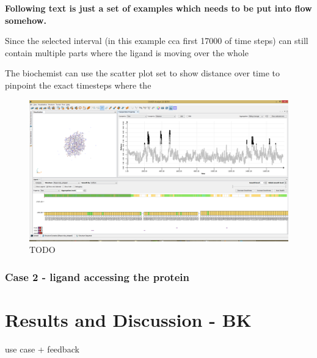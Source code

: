 \documentclass[twocolumn]{bmcart}%
\begin{document}
{\color{red}
\textbf{Following text is just a set of examples which needs to be put into flow somehow.}} 

Since the selected interval (in this example cca first 17000 of time steps) can still contain multiple parts where the ligand is moving over the whole    


The biochemist can use the scatter plot set to show distance over time to pinpoint the exact timesteps  where the 

\begin{figure}[htb]
	\centering
  \includegraphics[width=0.95\linewidth]{img/case_example_1.png}
  \caption{\label{fig:case_overview} {\color{red}TODO}}
\end{figure}








 



\subsubsection{Case 2 - ligand accessing the protein}
\label{sec:case2}
  



\section*{Results and Discussion - BK}
use case + feedback
\end{document}
